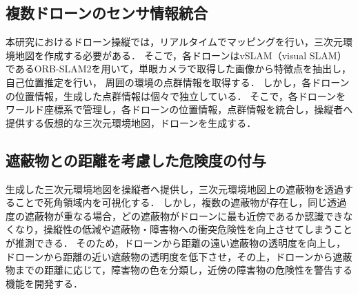 \documentclass[a4paper,10pt,twocolumn,uplatex]{jsarticle}
\begin{document}
\subsection{複数ドローンのセンサ情報統合}
本研究におけるドローン操縦では，リアルタイムでマッピングを行い，三次元環境地図を作成する必要がある．
そこで，各ドローンはvSLAM（visual SLAM）であるORB-SLAM2を用いて，単眼カメラで取得した画像から特徴点を抽出し，自己位置推定を行い，
周囲の環境の点群情報を取得する．
しかし，各ドローンの位置情報，生成した点群情報は個々で独立している．
そこで，各ドローンをワールド座標系で管理し，各ドローンの位置情報，点群情報を統合し，操縦者へ提供する仮想的な三次元環境地図，ドローンを生成する．
\subsection{遮蔽物との距離を考慮した危険度の付与}
生成した三次元環境地図を操縦者へ提供し，三次元環境地図上の遮蔽物を透過することで死角領域内を可視化する．
しかし，複数の遮蔽物が存在し，同じ透過度の遮蔽物が重なる場合，どの遮蔽物がドローンに最も近傍であるか認識できなくなり，操縦性の低減や遮蔽物・障害物への衝突危険性を向上させてしまうことが推測できる．
そのため，ドローンから距離の遠い遮蔽物の透明度を向上し，ドローンから距離の近い遮蔽物の透明度を低下させ，その上，ドローンから遮蔽物までの距離に応じて，障害物の色を分類し，近傍の障害物の危険性を警告する機能を開発する．

\end{document}
